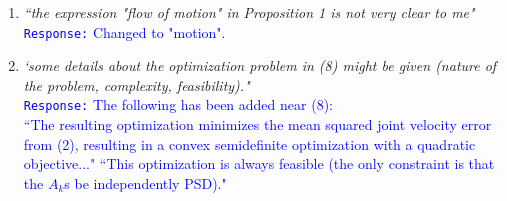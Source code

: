 \documentclass[10pt,stdletter,dateno]{newlfm}
\begin{document}
\begin{newlfm}
\begin{enumerate}
\item \textit{``the expression "flow of motion" in Proposition 1 is not very clear to me"}\\
\textcolor{blue}{\texttt{Response:} \small Changed to "motion".}\\

\item \textit{`some details about the optimization problem in (8) might be given
(nature of the problem, complexity, feasibility)."}\\
\textcolor{blue}{\texttt{Response:} \small The following has been added near (8):\\
``The resulting optimization minimizes the mean squared joint velocity error from (2), resulting in a convex semidefinite optimization with a quadratic objective..."
``This optimization is always feasible (the only constraint is that the $A_k$s be independently PSD)."\\
}\\



\end{enumerate}


\end{newlfm}
\end{document}
